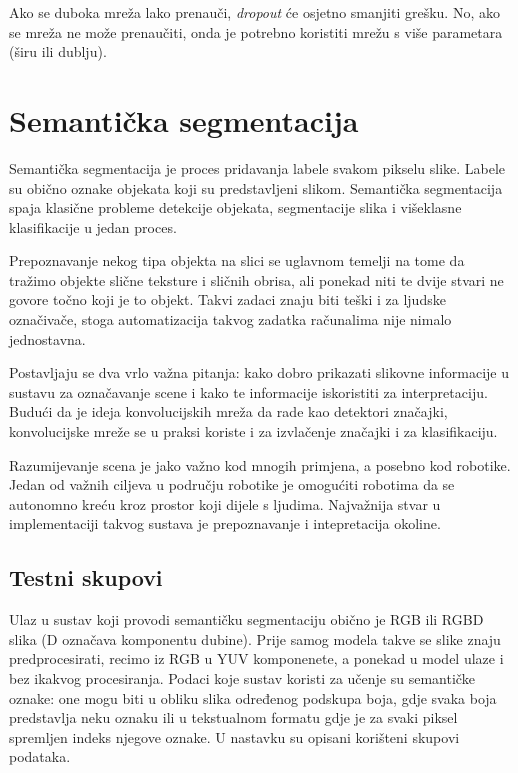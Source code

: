 \documentclass[times, utf8, diplomski, numeric]{fer}
\begin{document}
Ako se duboka mreža lako prenauči, \emph{dropout} će osjetno smanjiti grešku. No, ako se mreža ne može prenaučiti, onda je potrebno koristiti mrežu s više parametara (širu ili dublju).


\chapter{Semantička segmentacija}

Semantička segmentacija je proces pridavanja labele svakom pikselu slike. Labele su obično oznake objekata koji su predstavljeni slikom.
Semantička segmentacija spaja klasične probleme detekcije objekata, segmentacije slika i višeklasne klasifikacije u jedan proces.

Prepoznavanje nekog tipa objekta na slici se uglavnom temelji na tome da tražimo objekte slične teksture i sličnih obrisa, ali ponekad niti te dvije stvari ne govore točno koji je to objekt. Takvi zadaci znaju biti teški i za ljudske označivače, stoga automatizacija takvog zadatka računalima nije nimalo jednostavna.

Postavljaju se dva vrlo važna pitanja: kako dobro prikazati slikovne informacije u sustavu za označavanje scene i kako te informacije iskoristiti za interpretaciju. Budući da je ideja konvolucijskih mreža da rade kao detektori značajki, konvolucijske mreže se u praksi koriste i za izvlačenje značajki i za klasifikaciju.

Razumijevanje scena je jako važno kod mnogih primjena, a posebno kod robotike. Jedan od važnih ciljeva u području robotike je omogućiti robotima da se autonomno kreću kroz prostor koji dijele s ljudima. Najvažnija stvar u implementaciji takvog sustava je prepoznavanje i intepretacija okoline.


\section{Testni skupovi}

Ulaz u sustav koji provodi semantičku segmentaciju obično je RGB ili RGBD slika (D označava komponentu dubine). Prije samog modela takve se slike znaju predprocesirati, recimo iz RGB u YUV komponenete, a ponekad u model ulaze i bez ikakvog procesiranja. Podaci koje sustav koristi za učenje su semantičke oznake: one mogu biti u obliku slika određenog podskupa boja, gdje svaka boja predstavlja neku oznaku ili u tekstualnom formatu gdje je za svaki piksel spremljen indeks njegove oznake. U nastavku su opisani korišteni skupovi podataka.
\end{document}
